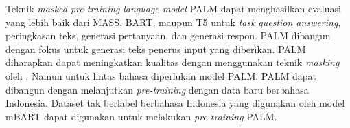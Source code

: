 Teknik \textit{masked pre-training} \textit{language model} \gls{PALM}  dapat menghasilkan evaluasi yang lebih baik dari \gls{MASS}, \gls{BART}, maupun T5 untuk \textit{task} \textit{question answering}, peringkasan teks, generasi pertanyaan, dan generasi respon.
\gls{PALM} dibangun dengan fokus untuk generasi teks penerus input yang diberikan.
\gls{PALM} diharapkan dapat meningkatkan kualitas \amrparsing{} dengan menggunakan teknik \textit{masking} oleh \textcite{bai2022}.
Namun untuk \amrparsing{} lintas bahasa diperlukan model \multil{} \gls{PALM}.
\Multil{} \gls{PALM} dapat dibangun dengan melanjutkan \textit{pre-training} dengan data baru berbahasa Indonesia.
Dataset tak berlabel berbahasa Indonesia yang digunakan oleh model mBART  dapat digunakan untuk melakukan \textit{pre-training} \multil{} \gls{PALM}.
